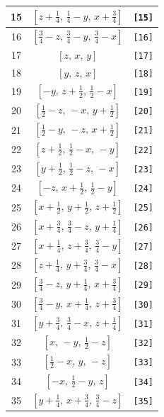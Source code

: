 \documentclass[fleqn,8pt]{jsarticle}
\begin{document}
\begin{longtable}{ccc}
15 & $\left[ z + \frac{1}{4},\, \frac{1}{4} - y,\, x + \frac{3}{4} \right]$ & {\tt [15]} \\ \hline
16 & $\left[ \frac{3}{4} - z,\, \frac{3}{4} - y,\, \frac{3}{4} - x \right]$ & {\tt [16]} \\ \hline
17 & $\left[ z,\, x,\, y \right]$ & {\tt [17]} \\ \hline
18 & $\left[ y,\, z,\, x \right]$ & {\tt [18]} \\ \hline
19 & $\left[ - y,\, z + \frac{1}{2},\, \frac{1}{2} - x \right]$ & {\tt [19]} \\ \hline
20 & $\left[ \frac{1}{2} - z,\, - x,\, y + \frac{1}{2} \right]$ & {\tt [20]} \\ \hline
21 & $\left[ \frac{1}{2} - y,\, - z,\, x + \frac{1}{2} \right]$ & {\tt [21]} \\ \hline
22 & $\left[ z + \frac{1}{2},\, \frac{1}{2} - x,\, - y \right]$ & {\tt [22]} \\ \hline
23 & $\left[ y + \frac{1}{2},\, \frac{1}{2} - z,\, - x \right]$ & {\tt [23]} \\ \hline
24 & $\left[ - z,\, x + \frac{1}{2},\, \frac{1}{2} - y \right]$ & {\tt [24]} \\ \hline
25 & $\left[ x + \frac{1}{2},\, y + \frac{1}{2},\, z + \frac{1}{2} \right]$ & {\tt [25]} \\ \hline
26 & $\left[ x + \frac{3}{4},\, \frac{3}{4} - z,\, y + \frac{1}{4} \right]$ & {\tt [26]} \\ \hline
27 & $\left[ x + \frac{1}{4},\, z + \frac{3}{4},\, \frac{3}{4} - y \right]$ & {\tt [27]} \\ \hline
28 & $\left[ z + \frac{1}{4},\, y + \frac{3}{4},\, \frac{3}{4} - x \right]$ & {\tt [28]} \\ \hline
29 & $\left[ \frac{3}{4} - z,\, y + \frac{1}{4},\, x + \frac{3}{4} \right]$ & {\tt [29]} \\ \hline
30 & $\left[ \frac{3}{4} - y,\, x + \frac{1}{4},\, z + \frac{3}{4} \right]$ & {\tt [30]} \\ \hline
31 & $\left[ y + \frac{3}{4},\, \frac{3}{4} - x,\, z + \frac{1}{4} \right]$ & {\tt [31]} \\ \hline
32 & $\left[ x,\, - y,\, \frac{1}{2} - z \right]$ & {\tt [32]} \\ \hline
33 & $\left[ \frac{1}{2} - x,\, y,\, - z \right]$ & {\tt [33]} \\ \hline
34 & $\left[ - x,\, \frac{1}{2} - y,\, z \right]$ & {\tt [34]} \\ \hline
35 & $\left[ y + \frac{1}{4},\, x + \frac{3}{4},\, \frac{3}{4} - z \right]$ & {\tt [35]} \\ \hline

\end{longtable}
\end{document}
